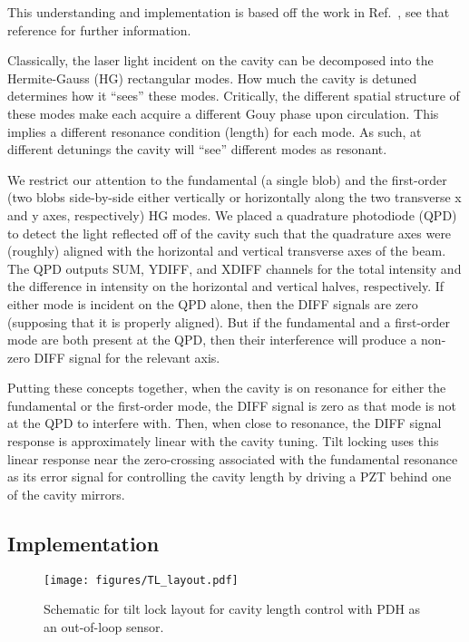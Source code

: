 \documentclass[aps,pra,superscriptaddress,reprint,nofootinbib]{revtex4-1}
\begin{document}
This understanding and implementation is based off the work in Ref.~\cite{TL:1999}, see that reference for further information.


Classically, the laser light incident on the cavity can be decomposed into the Hermite-Gauss (HG) rectangular modes. How much the cavity is detuned determines how it ``sees'' these modes. Critically, the different spatial structure of these modes make each acquire a different Gouy phase upon circulation. This implies a different resonance condition (length) for each mode. As such, at different detunings the cavity will ``see'' different modes as resonant.


We restrict our attention to the fundamental (a single blob) and the first-order (two blobs side-by-side either vertically or horizontally along the two transverse x and y axes, respectively) HG modes. We placed a quadrature photodiode (QPD) to detect the light reflected off of the cavity such that the quadrature axes were (roughly) aligned with the horizontal and vertical transverse axes of the beam. The QPD outputs SUM, YDIFF, and XDIFF channels for the total intensity and the difference in intensity on the horizontal and vertical halves, respectively. If either mode is incident on the QPD alone, then the DIFF signals are zero (supposing that it is properly aligned). But if the fundamental and a first-order mode are both present at the QPD, then their interference will produce a non-zero DIFF signal for the relevant axis.


Putting these concepts together, when the cavity is on resonance for either the fundamental or the first-order mode, the DIFF signal is zero as that mode is not at the QPD to interfere with. %
Then, when close to resonance, the DIFF signal response is approximately linear with the cavity tuning. Tilt locking uses this linear response near the zero-crossing associated with the fundamental resonance as its error signal for controlling the cavity length by driving a PZT behind one of the cavity mirrors.


\subsection{Implementation}

\begin{figure*}
	\texttt{[image: figures/TL\_layout.pdf]}
	\caption{Schematic for tilt lock layout for cavity length control with PDH as an out-of-loop sensor.}
	\label{fig:TL_layout}
\end{figure*}
\end{document}
